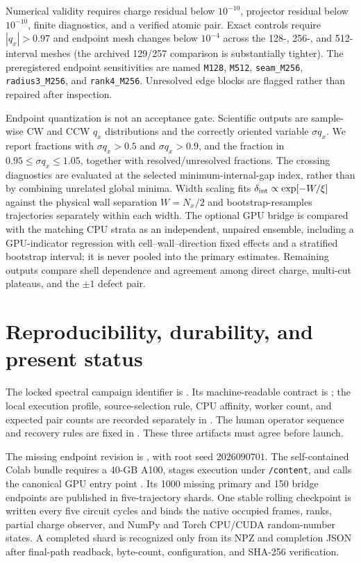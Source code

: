 \documentclass[aps,prb,twocolumn,floatfix,nofootinbib]{revtex4-2}
\begin{document}
Numerical validity requires charge residual below $10^{-10}$, projector
residual below $10^{-10}$, finite diagnostics, and a verified atomic pair.
Exact controls require $|q_x|>0.97$ and endpoint mesh changes below
$10^{-4}$ across the 128-, 256-, and 512-interval meshes (the archived
129/257 comparison is substantially tighter).  The preregistered endpoint
sensitivities are named \texttt{M128}, \texttt{M512},
\texttt{seam\_M256}, \texttt{radius3\_M256}, and
\texttt{rank4\_M256}.  Unresolved edge blocks are flagged rather than repaired
after inspection.

Endpoint quantization is not an acceptance gate.  Scientific outputs are
sample-wise CW and CCW $q_x$ distributions and the correctly oriented
variable $\sigma q_x$.  We report fractions with $\sigma q_x>0.5$ and
$\sigma q_x>0.9$, and the fraction in $0.95\le\sigma q_x\le1.05$, together
with resolved/unresolved fractions.  The crossing diagnostics are evaluated
at the selected minimum-internal-gap index, rather than by combining unrelated
global minima.  Width scaling fits
$\delta_{\rm int}\propto\exp[-W/\xi]$ against the physical wall separation
$W=N_x/2$ and bootstrap-resamples trajectories separately within each width.
The optional GPU bridge is compared with the matching CPU strata as an
independent, unpaired ensemble, including a GPU-indicator regression with
cell--wall--direction fixed effects and a stratified bootstrap interval; it is
never pooled into the primary estimates.  Remaining outputs compare shell
dependence and agreement among direct charge, multi-cut plateaus, and the
$\pm1$ defect pair.

\section{Reproducibility, durability, and present status}

The locked spectral campaign identifier is
.
Its machine-readable contract is
; the
local execution profile, source-selection rule, CPU affinity, worker count,
and expected pair counts are recorded separately in
.
The human operator sequence and recovery rules are fixed in
.  These three artifacts
must agree before launch.

The missing endpoint revision is
, with root seed
$2026090701$.  The self-contained Colab bundle requires a 40-GB A100, stages
execution under \texttt{/content}, and calls the canonical GPU entry point
.  Its 1000 missing primary
and 150 bridge endpoints are published in five-trajectory shards.  One stable
rolling checkpoint is written every five circuit cycles and binds the native
occupied frames, ranks, partial charge observer, and NumPy and Torch CPU/CUDA
random-number states.  A completed shard is recognized only from its NPZ and
completion JSON after final-path readback, byte-count, configuration, and
SHA-256 verification.
\end{document}
